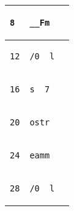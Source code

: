 \documentclass{ti2}
\begin{document}
\begin{tabular}{ | l | l | l|}
\begin{lstlisting}
8
\end{lstlisting} &
\begin{lstlisting}
__Fm
\end{lstlisting} &
\begin{lstlisting}
\end{lstlisting} \\ \hline

\begin{lstlisting}
12
\end{lstlisting} &
\begin{lstlisting}
/0__l
\end{lstlisting} &
\begin{lstlisting}
\end{lstlisting} \\ \hline

\begin{lstlisting}
16
\end{lstlisting} &
\begin{lstlisting}
s__7
\end{lstlisting} &
\begin{lstlisting}
\end{lstlisting} \\ \hline

\begin{lstlisting}
20
\end{lstlisting} &
\begin{lstlisting}
ostr
\end{lstlisting} &
\begin{lstlisting}
\end{lstlisting} \\ \hline

\begin{lstlisting}
24
\end{lstlisting} &
\begin{lstlisting}
eamm
\end{lstlisting} &
\begin{lstlisting}
\end{lstlisting} \\ \hline

\begin{lstlisting}
28
\end{lstlisting} &
\begin{lstlisting}
/0__l
\end{lstlisting} &
\begin{lstlisting}
\end{lstlisting} \\ \hline


\end{tabular}
\end{document}
